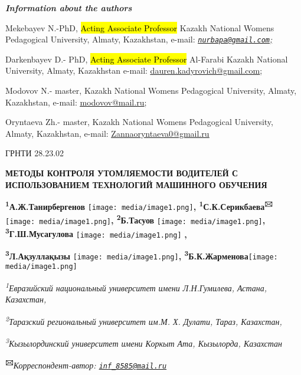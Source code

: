 \documentclass[
]{article}
\begin{document}
\emph{\textbf{Information about the authors}}

Mekebayev N.-PhD, \hl{Acting Associate Professor} Kazakh National
Women\textquotesingle s Pedagogical University, Almaty, Kazakhstan,
e-mail:
\emph{\ul{\href{mailto:nurbapa@gmail.com}{\nolinkurl{nurbapa@gmail.com}};}}

Darkenbayev D.- PhD, \hl{Acting Associate Professor} Al-Farabi Kazakh
National University, Almaty, Kazakhstan e-mail:
\href{mailto:dauren.kadyrovich@gmail.com}{\ul{dauren.kadyrovich@gmail.com}};

Modovov N.- master, Kazakh National Women\textquotesingle s Pedagogical
University, Almaty, Kazakhstan, e-mail:
\href{mailto:modovov@mail.ru}{\ul{modovov@mail.ru}};

Oryntaeva Zh.- master, Kazakh National Women\textquotesingle s
Pedagogical University, Almaty, Kazakhstan, e-mail:
\href{mailto:Zannaoryntaeva0@gmail.ru}{\ul{Zannaoryntaeva0@gmail.ru}}

ГРНТИ 28.23.02

\textbf{МЕТОДЫ КОНТРОЛЯ УТОМЛЯЕМОСТИ ВОДИТЕЛЕЙ С ИСПОЛЬЗОВАНИЕМ
ТЕХНОЛОГИЙ МАШИННОГО ОБУЧЕНИЯ}

\textbf{\textsuperscript{1}А.Ж.Танирбергенов}
\texttt{[image: media/image1.png]}\textbf{,
\textsuperscript{1}С.К.Серикбаева\textsuperscript{🖂}}
\texttt{[image: media/image1.png]}\textbf{,
\textsuperscript{2}Б.Тасуов}
\texttt{[image: media/image1.png]}\textbf{,
\textsuperscript{3}Г.Ш.Мусагулова}
\texttt{[image: media/image1.png]}
\textbf{,}

\textbf{\textsuperscript{3}Л.Ақзуллақызы}
\texttt{[image: media/image1.png]}\textbf{,
\textsuperscript{3}Б.К.Жарменова}\texttt{[image: media/image1.png]}

\emph{\textsuperscript{1}Евразийский национальный университет имени
Л.Н.Гумилева, Астана, Казахстан,}

\emph{\textsuperscript{2}Таразский региональный университет им.М. Х.
Дулати, Тараз, Казахстан,}

\emph{\textsuperscript{3}Кызылординский университет имени Коркыт Ата,
Кызылорда, Казахстан}

\textbf{\textsuperscript{🖂}}\emph{Корреспондент-автор:
\href{mailto:inf_8585@mail.ru}{\nolinkurl{inf\_8585@mail.ru}}}
\end{document}
